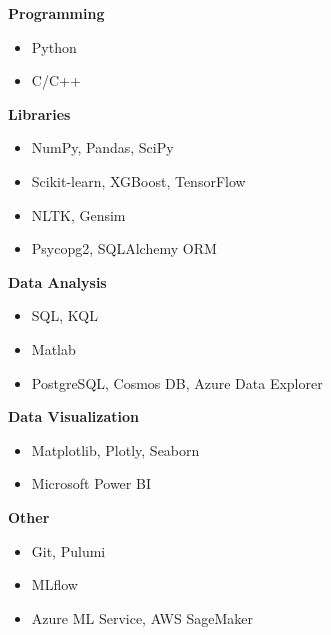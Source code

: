 
\vspace{0.35mm}

\textbf{Programming}\smallskip
\begin{itemize}
\item Python
\item C/C++
\end{itemize}
\vspace{3mm}

\textbf{Libraries}\smallskip
\begin{itemize}
\item NumPy, Pandas, SciPy
\item Scikit-learn, XGBoost, TensorFlow
\item NLTK, Gensim
\item Psycopg2, SQLAlchemy ORM
\end{itemize}
\vspace{3mm}

\textbf{Data Analysis}\smallskip
\begin{itemize}
\item SQL, KQL
\item Matlab
\item PostgreSQL, Cosmos DB, Azure Data Explorer
\end{itemize}
\vspace{3mm}

\textbf{Data Visualization}\smallskip
\begin{itemize}
\item Matplotlib, Plotly, Seaborn
\item Microsoft Power BI
\end{itemize}
\vspace{3mm}

\textbf{Other}\smallskip
\begin{itemize}
\item Git, Pulumi
\item MLflow
\item Azure ML Service, AWS SageMaker
\end{itemize}



